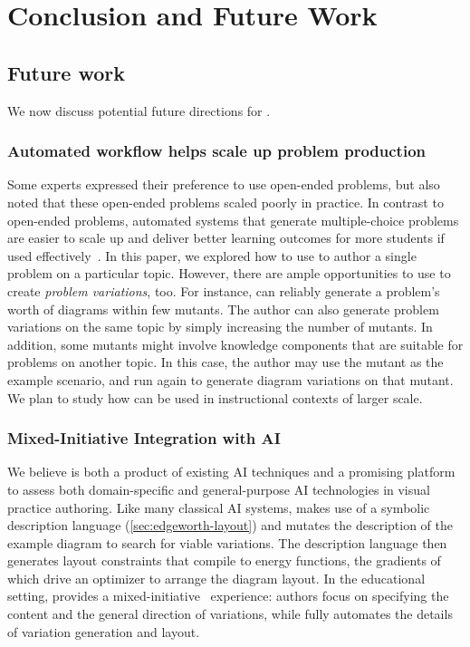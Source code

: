 \chapter{Conclusion and Future Work}
\label{chp:conclusion}

\section{Future work}

We now discuss potential future directions for \Edgeworth. 


\subsection{Automated workflow helps scale up problem production}

Some experts expressed their preference to use open-ended problems, but also noted that these open-ended problems scaled poorly in practice. In contrast to open-ended problems, automated systems that generate multiple-choice problems are easier to scale up and deliver better learning outcomes for more students if used effectively~\cite{Wang2021}. In this paper, we explored how to use \Edgeworth to author a single problem on a particular topic. However, there are ample opportunities to use \Edgeworth to create \textit{problem variations}, too. For instance, \Edgeworth can reliably generate a problem's worth of diagrams within few mutants. The author can also generate problem variations on the same topic by simply increasing the number of mutants. In addition, some \Edgeworth mutants might involve knowledge components that are suitable for problems on another topic. In this case, the author may use the mutant as the example scenario, and run \Edgeworth again to generate diagram variations on that mutant. We plan to study how \Edgeworth can be used in instructional contexts of larger scale.


\subsection{Mixed-Initiative Integration with AI}

We believe \Edgeworth is both a product of existing AI techniques and a promising platform to assess both domain-specific and general-purpose AI technologies in visual practice authoring. Like many classical AI systems, \Edgeworth makes use of a symbolic description language (\cref{sec:edgeworth-layout}) and mutates the description of the example diagram to search for viable variations. The description language then generates layout constraints that compile to energy functions, the gradients of which drive an optimizer to arrange the diagram layout. In the educational setting, \Edgeworth provides a mixed-initiative~\cite{allen1999mixedinitiative} experience: authors focus on specifying the content and the general direction of variations, while \Edgeworth fully automates the details of variation generation and layout. 

